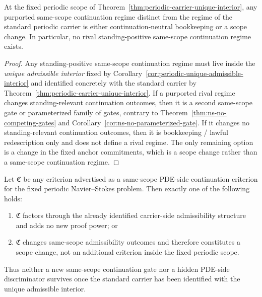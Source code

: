 \begin{manualcorollary}
\label{cor:no-alternative-same-scope-regime}
At the fixed periodic scope of Theorem~\ref{thm:periodic-carrier-unique-interior}, any purported
same-scope continuation regime distinct from the regime of the standard periodic carrier is either
continuation-neutral bookkeeping or a scope change. In particular, no rival standing-positive
same-scope continuation regime exists.
\end{manualcorollary}

\begin{proof}
Any standing-positive same-scope continuation regime must live inside the \emph{unique admissible
interior} fixed by Corollary~\ref{cor:periodic-unique-admissible-interior} and identified concretely with the
standard carrier by Theorem~\ref{thm:periodic-carrier-unique-interior}. If a purported rival regime
changes standing-relevant continuation outcomes, then it is a second same-scope gate or parameterized
family of gates, contrary to Theorem~\ref{thm:ns-no-competing-gates} and
Corollary~\ref{cor:ns-no-parameterized-gate}. If it changes no standing-relevant continuation
outcomes, then it is bookkeeping / lawful redescription only and does not define a rival regime. The
only remaining option is a change in the fixed anchor commitments, which is a scope change rather
than a same-scope continuation regime.
\end{proof}

\begin{manualproposition}
\label{prop:no-additional-pde-side-criterion}
Let $\mathfrak C$ be any criterion advertised as a same-scope PDE-side continuation criterion for the
fixed periodic Navier--Stokes problem. Then exactly one of the following holds:
\begin{enumerate}[label=(\roman*), leftmargin=2.2em]
\item $\mathfrak C$ factors through the already identified carrier-side admissibility structure and adds
no new proof power; or
\item $\mathfrak C$ changes same-scope admissibility outcomes and therefore constitutes a scope change,
not an additional criterion inside the fixed periodic scope.
\end{enumerate}
Thus neither a new same-scope continuation gate nor a hidden PDE-side discriminator survives once the
standard carrier has been identified with the unique admissible interior.
\end{manualproposition}

